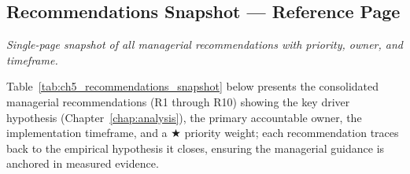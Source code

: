 \subsection{Recommendations Snapshot --- Reference Page}
\label{sec:ch5_recommendations_snapshot}

\noindent\emph{Single-page snapshot of all managerial recommendations with priority, owner, and timeframe.}

\noindent Table~\ref{tab:ch5_recommendations_snapshot} below presents the consolidated managerial recommendations (R1 through R10) showing the key driver hypothesis (Chapter~\ref{chap:analysis}), the primary accountable owner, the implementation timeframe, and a $\bigstar$ priority weight; each recommendation traces back to the empirical hypothesis it closes, ensuring the managerial guidance is anchored in measured evidence.

